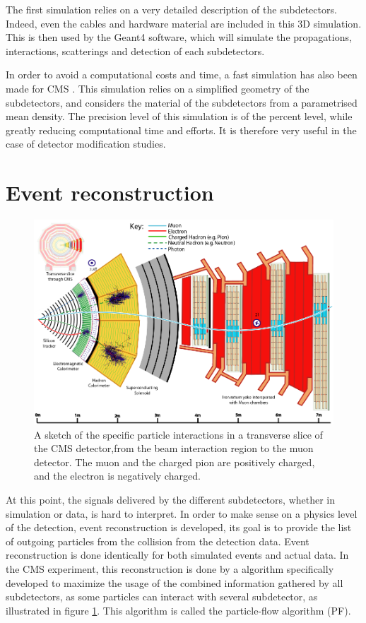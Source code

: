 The first simulation relies on a very detailed description of the subdetectors. Indeed, even the cables and hardware material are included in this 3D simulation. This is then used by the Geant4 software, which will simulate the propagations, interactions, scatterings and detection of each subdetectors.

In order to avoid a computational costs and time, a fast simulation has also been made for CMS \cite{Abdullin_2011}. This simulation relies on a simplified geometry of the subdetectors, and considers the material of the subdetectors from a parametrised mean density. The precision level of this simulation is of the percent level, while greatly reducing computational time and efforts. It is therefore very useful in the case of detector modification studies.

\section{Event reconstruction}
\label{sec:cms_physics_event_reconstruction}

\begin{figure}
    \centering
    \includegraphics[width=\textwidth]{Images/pflow_illustration_2.png}
    \caption{A sketch of the specific particle interactions in a transverse slice of the CMS detector,from the beam interaction region to the muon detector.  The muon and the charged pion are positively charged, and the electron is negatively charged.}
    \label{fig:pflow_illustration}
\end{figure}

At this point, the signals delivered by the different subdetectors, whether in simulation or data, is hard to interpret. In order to make sense on a physics level of the detection, event reconstruction is developed, its goal is to provide the list of outgoing particles from the collision from the detection data. Event reconstruction is done identically for both simulated events and actual data. In the CMS experiment, this reconstruction is done by a algorithm specifically developed to maximize the usage of the combined information gathered by all subdetectors, as some particles can interact with several subdetector, as illustrated in figure \ref{fig:pflow_illustration}. This algorithm is called the particle-flow algorithm (PF). 

